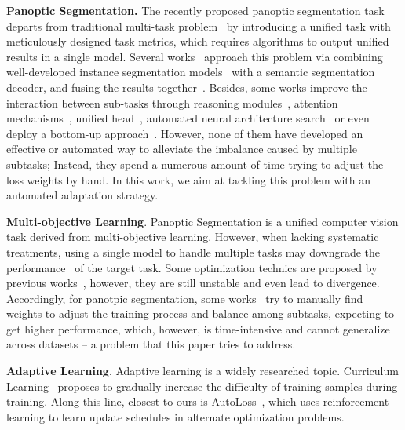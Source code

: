 \documentclass[letterpaper]{article} \usepackage{aaai21}  \usepackage{times}  \usepackage{helvet} \usepackage{courier}  \usepackage[hyphens]{url}  \usepackage{graphicx} \urlstyle{rm} \def\UrlFont{\rm}  \usepackage{natbib}  \usepackage{caption} \frenchspacing  \setlength{\pdfpagewidth}{8.5in}  \setlength{\pdfpageheight}{11in}
\begin{document}
 \textbf{Panoptic Segmentation. } 
 The recently proposed panoptic segmentation task~\cite{panoptic_segmentation} 
 departs from traditional multi-task problem~\cite{imageParsingtu2005,farhadi2009describing} 
 by introducing a unified task with meticulously designed task metrics, 
 which requires algorithms to output unified results in a single model. 
 Several works~\cite{panopticFPNkirillov2019,seamlessporzi2019} approach this problem via combining well-developed instance segmentation 
 models~\cite{he2017mask} with a semantic segmentation decoder, 
 and fusing the results together~\cite{oanetLiu2019,panopticFPNkirillov2019,seamlessporzi2019}. 
 Besides, some works improve the interaction between sub-tasks through reasoning modules~\cite{wu2020bgr}, 
 attention mechanisms~\cite{chen2020banet,AunetLi_2019_},
  unified head~\cite{upsnetxiong2019}, automated neural architecture search~\cite{wu2020autopanoptic} or even deploy a bottom-up approach~\cite{cheng2019panopticdeeplab}. 
 However, none of them have developed an effective or automated way to alleviate the imbalance caused by multiple subtasks; 
 Instead, they spend a numerous amount of time trying to adjust the loss weights by hand. 
 In this work, we aim at tackling this problem with an automated adaptation strategy. 
 
 \noindent
 \textbf{Multi-objective Learning}. 
 Panoptic Segmentation is a unified computer vision task derived from multi-objective learning. 
 However, when lacking systematic treatments, using a single model to handle multiple tasks 
 may downgrade the performance~\cite{kokkinos2017ubernet} of the target task. 
Some optimization technics are proposed by previous works~\cite{kendall2018uncertainty,chen2017gradnorm}, 
 however, they are still unstable and even lead to divergence.
Accordingly, for panotpic segmentation, some 
 works~\cite{upsnetxiong2019,panopticFPNkirillov2019,oanetLiu2019} 
 try to manually find weights to adjust the training process and balance among subtasks, expecting to get higher performance, 
 which, however, is time-intensive and cannot generalize across datasets -- a problem that this paper tries to address.
 
 \noindent
 \textbf{Adaptive Learning}. Adaptive learning is a widely researched topic. 
 Curriculum Learning~\cite{bengio2009curriculum,lin2018focal,ren2018autoreweigthing} 
 proposes to gradually increase the difficulty of training samples during training. Along this line, 
 closest to ours is AutoLoss~\cite{xu2018autoloss}, 
 which uses reinforcement learning to learn update schedules in alternate optimization problems.
\end{document}

